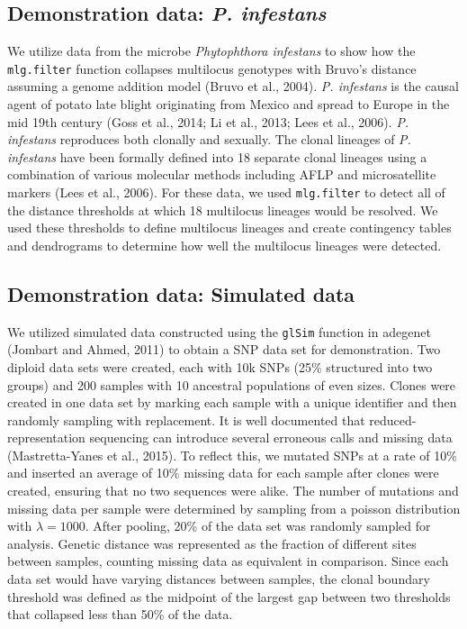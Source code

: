 \documentclass{frontiersSCNS} %
\begin{document}
\subsection*{\texorpdfstring{Demonstration data: \emph{P.
infestans}}{Demonstration data: P. infestans}}\label{demonstration-data-p.-infestans}

We utilize data from the microbe \emph{Phytophthora infestans} to show
how the \texttt{mlg.filter} function collapses multilocus genotypes with
Bruvo's distance assuming a genome addition model (Bruvo et al., 2004).
\emph{P. infestans} is the causal agent of potato late blight
originating from Mexico and spread to Europe in the mid 19th century
(Goss et al., 2014; Li et al., 2013; Lees et al., 2006). \emph{P.
infestans} reproduces both clonally and sexually. The clonal lineages of
\emph{P. infestans} have been formally defined into 18 separate clonal
lineages using a combination of various molecular methods including AFLP
and microsatellite markers (Lees et al., 2006). For these data, we used
\texttt{mlg.filter} to detect all of the distance thresholds at which 18
multilocus lineages would be resolved. We used these thresholds to
define multilocus lineages and create contingency tables and dendrograms
to determine how well the multilocus lineages were detected.

\subsection*{Demonstration data: Simulated
data}\label{demonstration-data-simulated-data}

We utilized simulated data constructed using the \texttt{glSim} function
in adegenet (Jombart and Ahmed, 2011) to obtain a SNP data set for
demonstration. Two diploid data sets were created, each with 10k SNPs
(25\% structured into two groups) and 200 samples with 10 ancestral
populations of even sizes. Clones were created in one data set by
marking each sample with a unique identifier and then randomly sampling
with replacement. It is well documented that reduced- representation
sequencing can introduce several erroneous calls and missing data
(Mastretta-Yanes et al., 2015). To reflect this, we mutated SNPs at a
rate of 10\% and inserted an average of 10\% missing data for each
sample after clones were created, ensuring that no two sequences were
alike. The number of mutations and missing data per sample were
determined by sampling from a poisson distribution with
\(\lambda = 1000\). After pooling, 20\% of the data set was randomly
sampled for analysis. Genetic distance was represented as the fraction
of different sites between samples, counting missing data as equivalent
in comparison. Since each data set would have varying distances between
samples, the clonal boundary threshold was defined as the midpoint of
the largest gap between two thresholds that collapsed less than 50\% of
the data.
\end{document}
